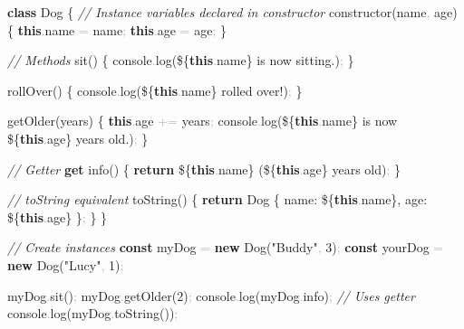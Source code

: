 \documentclass[
  justified,
  openright,
]{tufte-book}
\newcommand{\KeywordTok}[1]{\textcolor{CodeKeyword}{\textbf{#1}}}  %
\newcommand{\StringTok}[1]{\textcolor{CodeString}{#1}}              %
\newcommand{\CommentTok}[1]{\textcolor{CodeComment}{\textit{#1}}}  %
\newcommand{\CodeNumTok}[1]{\textcolor{CodeNumber}{#1}}             %
\newcommand{\CodeFuncTok}[1]{\textcolor{CodeKeyword}{#1}}           %
\newcommand{\CodeTypeTok}[1]{\textcolor{CodeType}{#1}}              %
\newcommand{\OperatorTok}[1]{\textcolor{DarkGray}{#1}}              %
\newenvironment{Shaded}{%
  \begin{mdframed}[style=TufteCode]%
}{%
  \end{mdframed}%
}
\begin{document}
\begin{Shaded}
\begin{Highlighting}[]
\KeywordTok{class} Dog \{
  \CommentTok{// Instance variables declared in constructor}
  \CodeFuncTok{constructor}(name\OperatorTok{,} age) \{
    \KeywordTok{this}\OperatorTok{.}\CodeTypeTok{name} \OperatorTok{=} name\OperatorTok{;}
    \KeywordTok{this}\OperatorTok{.}\CodeTypeTok{age} \OperatorTok{=} age\OperatorTok{;}
  \}
 
  \CommentTok{// Methods}
  \CodeFuncTok{sit}() \{
    console\OperatorTok{.}\CodeFuncTok{log}(\StringTok{\textasciigrave{}}\StringTok{\$\{}\KeywordTok{this}\OperatorTok{.}\CodeTypeTok{name}\StringTok{\}}\StringTok{ is now sitting.\textasciigrave{}})\OperatorTok{;}
  \}
 
  \CodeFuncTok{rollOver}() \{
    console\OperatorTok{.}\CodeFuncTok{log}(\StringTok{\textasciigrave{}}\StringTok{\$\{}\KeywordTok{this}\OperatorTok{.}\CodeTypeTok{name}\StringTok{\}}\StringTok{ rolled over!\textasciigrave{}})\OperatorTok{;}
  \}
 
  \CodeFuncTok{getOlder}(years) \{
    \KeywordTok{this}\OperatorTok{.}\CodeTypeTok{age} \OperatorTok{+=} years\OperatorTok{;}
    console\OperatorTok{.}\CodeFuncTok{log}(\StringTok{\textasciigrave{}}\StringTok{\$\{}\KeywordTok{this}\OperatorTok{.}\CodeTypeTok{name}\StringTok{\}}\StringTok{ is now }\StringTok{\$\{}\KeywordTok{this}\OperatorTok{.}\CodeTypeTok{age}\StringTok{\}}\StringTok{ years old.\textasciigrave{}})\OperatorTok{;}
  \}
 
  \CommentTok{// Getter}
  \KeywordTok{get} \CodeFuncTok{info}() \{
    \KeywordTok{return} \StringTok{\textasciigrave{}}\StringTok{\$\{}\KeywordTok{this}\OperatorTok{.}\CodeTypeTok{name}\StringTok{\}}\StringTok{ (}\StringTok{\$\{}\KeywordTok{this}\OperatorTok{.}\CodeTypeTok{age}\StringTok{\}}\StringTok{ years old)\textasciigrave{}}\OperatorTok{;}
  \}
 
  \CommentTok{// toString equivalent}
  \CodeFuncTok{toString}() \{
    \KeywordTok{return} \StringTok{\textasciigrave{}Dog \{ name: \textquotesingle{}}\StringTok{\$\{}\KeywordTok{this}\OperatorTok{.}\CodeTypeTok{name}\StringTok{\}}\StringTok{\textquotesingle{}, age: }\StringTok{\$\{}\KeywordTok{this}\OperatorTok{.}\CodeTypeTok{age}\StringTok{\}}\StringTok{ \}\textasciigrave{}}\OperatorTok{;}
  \}
\}
 
\CommentTok{// Create instances}
\KeywordTok{const} myDog \OperatorTok{=} \KeywordTok{new} \CodeFuncTok{Dog}(\StringTok{"Buddy"}\OperatorTok{,} \CodeNumTok{3})\OperatorTok{;}
\KeywordTok{const} yourDog \OperatorTok{=} \KeywordTok{new} \CodeFuncTok{Dog}(\StringTok{"Lucy"}\OperatorTok{,} \CodeNumTok{1})\OperatorTok{;}
 
myDog\OperatorTok{.}\CodeFuncTok{sit}()\OperatorTok{;}
myDog\OperatorTok{.}\CodeFuncTok{getOlder}(\CodeNumTok{2})\OperatorTok{;}
console\OperatorTok{.}\CodeFuncTok{log}(myDog\OperatorTok{.}\CodeTypeTok{info})\OperatorTok{;} \CommentTok{// Uses getter}
console\OperatorTok{.}\CodeFuncTok{log}(myDog\OperatorTok{.}\CodeFuncTok{toString}())\OperatorTok{;}
\end{Highlighting}
\end{Shaded}
\end{document}

